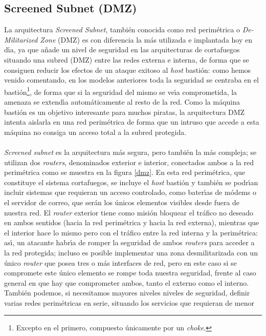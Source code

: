 \subsection{Screened Subnet (DMZ)}
La arquitectura {\it Screened Subnet}, tambi\'en conocida como red perim\'etrica
o {\it De-Militarized Zone} (DMZ) es con diferencia la m\'as utilizada e 
implantada hoy en d\'{\i}a, ya que a\~nade un nivel de seguridad en las 
arquitecturas de cortafuegos situando una subred (DMZ) entre las redes externa
e interna, de forma que se consiguen reducir los efectos de un ataque exitoso al
{\it host} basti\'on: como hemos venido comentando, en los modelos anteriores 
toda la seguridad se centraba
en el basti\'on\footnote{Excepto en el primero, compuesto \'unicamente por un
{\it choke}.}, de forma que si la seguridad del mismo se ve\'{\i}a comprometida,
la amenaza se extend\'{\i}a autom\'aticamente al resto de la red. Como la
m\'aquina basti\'on es un objetivo interesante para muchos piratas, la 
arquitectura DMZ intenta aislarla en una red perim\'etrica de forma que un 
intruso que accede a esta m\'aquina no consiga un acceso total a la subred 
protegida.\\
\\{\it Screened subnet} es la arquitectura m\'as segura, pero tambi\'en la m\'as
compleja; se utilizan dos {\it routers}, denominados exterior e interior, 
conectados ambos a la red perim\'etrica como se muestra en la figura \ref{dmz}. 
En esta red perim\'etrica, que constituye el sistema cortafuegos, se incluye el 
{\it host} basti\'on y tambi\'en se podr\'{\i}an incluir sistemas que requieran 
un acceso controlado, como bater\'{\i}as de m\'odems o el servidor de correo, 
que ser\'an los \'unicos elementos visibles desde fuera de nuestra red. El
{\it router} exterior tiene como misi\'on bloquear el tr\'afico no deseado en
ambos sentidos (hacia la red perim\'etrica y hacia la red externa), mientras
que el interior hace lo mismo pero con el tr\'afico entre la red interna y la
perim\'etrica: as\'{\i}, un atacante habr\'{\i}a de romper la seguridad
de ambos {\it routers} para acceder a la red protegida; incluso es posible 
implementar una zona desmilitarizada con un
\'unico {\it router} que posea tres o m\'as interfaces de red, pero en este caso
si se compromete este \'unico elemento se rompe toda nuestra seguridad, frente
al caso general en que hay que comprometer ambos, tanto el externo como el
interno. Tambi\'en podemos, si necesitamos mayores niveles niveles de 
seguridad, definir varias redes 
perim\'etricas en serie, situando los servicios que requieran de menor 
